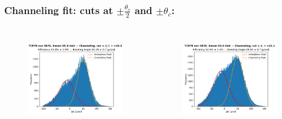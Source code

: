 \documentclass[10pt]{beamer}
\begin{document}
\begin{frame}
\frametitle{Channeling fit: cuts at $\pm \frac{\theta_c}{2}$ and $\pm \theta_c$:}

\begin{columns}[c] %

\begin{figure}
\includegraphics[width=\linewidth]{half_thetac_chan_histo.pdf}\\
\end{figure}

\begin{figure}
\includegraphics[width=\linewidth]{thetac_chan_histo.pdf}\\
\end{figure}

\end{columns}
\end{frame}
\end{document}
